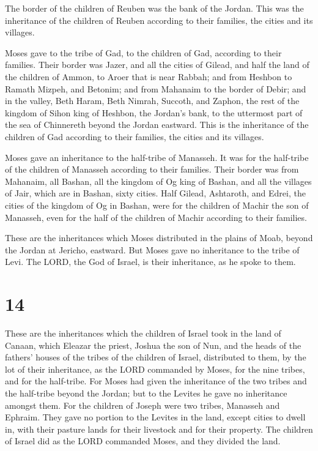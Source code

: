  The border of the children of Reuben was the bank of the
Jordan. This was the inheritance of the children of Reuben according to
their families, the cities and its villages.

 Moses gave to the tribe of Gad, to the children of Gad,
according to their families.  Their border was Jazer, and
all the cities of Gilead, and half the land of the children of Ammon, to
Aroer that is near Rabbah;  and from Heshbon to Ramath
Mizpeh, and Betonim; and from Mahanaim to the border of Debir;
 and in the valley, Beth Haram, Beth Nimrah, Succoth, and
Zaphon, the rest of the kingdom of Sihon king of Heshbon, the Jordan's
bank, to the uttermost part of the sea of Chinnereth beyond the Jordan
eastward.  This is the inheritance of the children of Gad
according to their families, the cities and its villages.

 Moses gave an inheritance to the half-tribe of Manasseh.
It was for the half-tribe of the children of Manasseh according to their
families.  Their border was from Mahanaim, all Bashan,
all the kingdom of Og king of Bashan, and all the villages of Jair,
which are in Bashan, sixty cities.  Half Gilead,
Ashtaroth, and Edrei, the cities of the kingdom of Og in Bashan, were
for the children of Machir the son of Manasseh, even for the half of the
children of Machir according to their families.

 These are the inheritances which Moses distributed in
the plains of Moab, beyond the Jordan at Jericho, eastward.
 But Moses gave no inheritance to the tribe of Levi. The
LORD, the God of Israel, is their inheritance, as he spoke to them.

\hypertarget{section-13}{%
\section{14}\label{section-13}}

 These are the inheritances which the children of Israel
took in the land of Canaan, which Eleazar the priest, Joshua the son of
Nun, and the heads of the fathers' houses of the tribes of the children
of Israel, distributed to them,  by the lot of their
inheritance, as the LORD commanded by Moses, for the nine tribes, and
for the half-tribe.  For Moses had given the inheritance
of the two tribes and the half-tribe beyond the Jordan; but to the
Levites he gave no inheritance amongst them.  For the
children of Joseph were two tribes, Manasseh and Ephraim. They gave no
portion to the Levites in the land, except cities to dwell in, with
their pasture lands for their livestock and for their property.
 The children of Israel did as the LORD commanded Moses,
and they divided the land.

